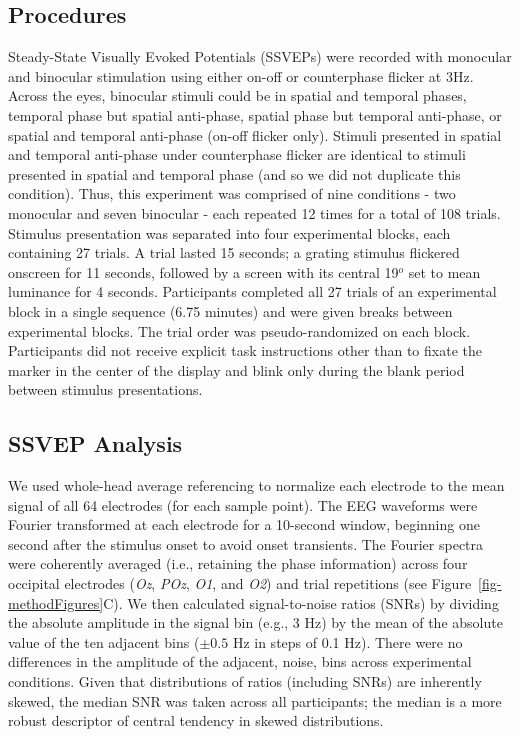 \documentclass[
  12pt,
]{article}
\begin{document}
\subsection{Procedures}\label{procedures}

Steady-State Visually Evoked Potentials (SSVEPs) were recorded with
monocular and binocular stimulation using either on-off or counterphase
flicker at 3Hz. Across the eyes, binocular stimuli could be in spatial
and temporal phases, temporal phase but spatial anti-phase, spatial
phase but temporal anti-phase, or spatial and temporal anti-phase
(on-off flicker only). Stimuli presented in spatial and temporal
anti-phase under counterphase flicker are identical to stimuli presented
in spatial and temporal phase (and so we did not duplicate this
condition). Thus, this experiment was comprised of nine conditions - two
monocular and seven binocular - each repeated 12 times for a total of
108 trials. Stimulus presentation was separated into four experimental
blocks, each containing 27 trials. A trial lasted 15 seconds; a grating
stimulus flickered onscreen for 11 seconds, followed by a screen with
its central 19\(^o\) set to mean luminance for 4 seconds. Participants
completed all 27 trials of an experimental block in a single sequence
(6.75 minutes) and were given breaks between experimental blocks. The
trial order was pseudo-randomized on each block. Participants did not
receive explicit task instructions other than to fixate the marker in
the center of the display and blink only during the blank period between
stimulus presentations.

\subsection{SSVEP Analysis}\label{ssvep-analysis}

We used whole-head average referencing to normalize each electrode to
the mean signal of all 64 electrodes (for each sample point). The EEG
waveforms were Fourier transformed at each electrode for a 10-second
window, beginning one second after the stimulus onset to avoid onset
transients. The Fourier spectra were coherently averaged (i.e.,
retaining the phase information) across four occipital electrodes
(\emph{Oz}, \emph{POz}, \emph{O1}, and \emph{O2}) and trial repetitions
(see Figure~\ref{fig-methodFigures}C). We then calculated
signal-to-noise ratios (SNRs) by dividing the absolute amplitude in the
signal bin (e.g., 3 Hz) by the mean of the absolute value of the ten
adjacent bins (\(\pm 0.5\) Hz in steps of 0.1 Hz). There were no
differences in the amplitude of the adjacent, noise, bins across
experimental conditions. Given that distributions of ratios (including
SNRs) are inherently skewed, the median SNR was taken across all
participants; the median is a more robust descriptor of central tendency
in skewed distributions.
\end{document}
